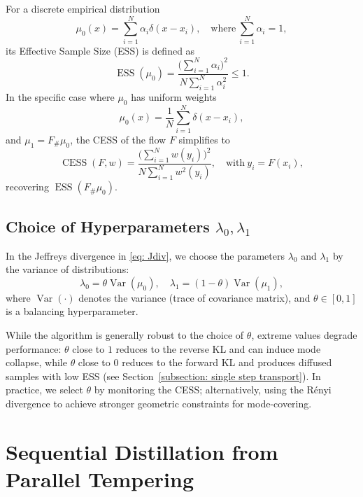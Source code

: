 \documentclass[%
 reprint,
 amsmath,amssymb,
 aps,
 pre,
]{revtex4-2}
\DeclareMathOperator{\Var}{Var}
\DeclareMathOperator{\ESS}{ESS}
\DeclareMathOperator{\CESS}{CESS}
\newcommand{\Le}{\leqslant}
\begin{document}
For a discrete empirical distribution
\begin{equation*}
	\mu_0(x) = \sum_{i=1}^N \alpha_i \delta(x-x_i),\quad 
	\text{where} ~
	\sum_{i=1}^N \alpha_i = 1,
\end{equation*}
its Effective Sample Size (ESS) is defined as
\begin{equation}
	\ESS(\mu_0) = \frac{\big(\sum_{i=1}^N \alpha_i\big)^2}{N\sum_{i=1}^N \alpha_i^2} \Le 1.
\end{equation}
In the specific case where $\mu_0$ has uniform weights
\begin{equation*}
	\mu_0(x) = \frac{1}{N} \sum_{i=1}^N \delta(x-x_i),
\end{equation*}
and $\mu_1 = F_\# \mu_0$, the CESS of the flow $F$ simplifies to
\begin{equation*}
	\CESS(F,w) = \frac{\big(\sum_{i=1}^N w(y_i)\big)^2}{N\sum_{i=1}^N w^2(y_i)},\quad \text{with} ~ y_i = F(x_i),
\end{equation*}
recovering $\ESS(F_\# \mu_0)$.

\subsection{Choice of Hyperparameters \(\lambda_0, \lambda_1\)}

In the Jeffreys divergence in \eqref{eq: Jdiv}, we choose the parameters $\lambda_0$ and $\lambda_1$ by the variance of distributions:
\begin{equation}
	\lambda_0 = \theta \Var(\mu_0), \quad \lambda_1 = (1 - \theta) \Var(\mu_1),
	\label{eq: lambda 01}
\end{equation}
where $\Var(\cdot)$ denotes the variance (trace of covariance matrix), and $\theta \in [0, 1]$ is a balancing hyperparameter.

While the algorithm is generally robust to the choice of $\theta$, extreme values degrade performance: $\theta$ close to $1$ reduces to the reverse KL and can induce mode collapse, while $\theta$ close to $0$ reduces to the forward KL and produces diffused samples with low ESS (see Section~\ref{subsection: single step transport}). In practice, we select $\theta$ by monitoring the CESS; alternatively, using the R\'enyi divergence to achieve stronger geometric constraints for mode-covering.

\section{Sequential Distillation from Parallel Tempering}
\label{section: sequential distillation}
\end{document}
